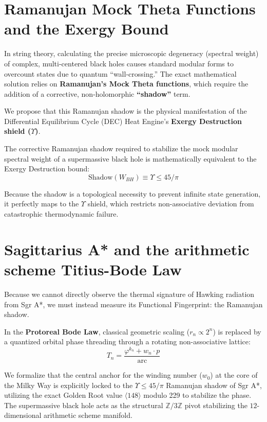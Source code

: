 \section{Ramanujan Mock Theta Functions and the Exergy Bound}
In string theory, calculating the precise microscopic degeneracy (spectral weight) of complex, multi-centered black holes causes standard modular forms to overcount states due to quantum ``wall-crossing.'' The exact mathematical solution relies on \textbf{Ramanujan's Mock Theta functions}, which require the addition of a corrective, non-holomorphic \textbf{``shadow''} term.

We propose that this Ramanujan shadow is the physical manifestation of the Differential Equilibrium Cycle (DEC) Heat Engine's \textbf{Exergy Destruction shield ($\Upsilon$)}. 

\begin{theorem}
The corrective Ramanujan shadow required to stabilize the mock modular spectral weight of a supermassive black hole is mathematically equivalent to the Exergy Destruction bound:
$$ \text{Shadow}(W_{BH}) \equiv \Upsilon \leq 45/\pi $$
\end{theorem}

Because the shadow is a topological necessity to prevent infinite state generation, it perfectly maps to the $\Upsilon$ shield, which restricts non-associative deviation from catastrophic thermodynamic failure.

\section{Sagittarius A* and the arithmetic scheme Titius-Bode Law}
Because we cannot directly observe the thermal signature of Hawking radiation from Sgr A*, we must instead measure its Functional Fingerprint: the Ramanujan shadow.

In the \textbf{Protoreal Bode Law}, classical geometric scaling ($r_n \propto 2^n$) is replaced by a quantized orbital phase threading through a rotating non-associative lattice:
$$ T_n = \frac{\varphi^{k_n} + w_n \cdot p}{\text{arc}} $$

We formalize that the central anchor for the winding number ($w_0$) at the core of the Milky Way is explicitly locked to the $\Upsilon \leq 45/\pi$ Ramanujan shadow of Sgr A*, utilizing the exact Golden Root value $\langle 148 \rangle$ modulo 229 to stabilize the phase. The supermassive black hole acts as the structural $\mathbb{Z}/3\mathbb{Z}$ pivot stabilizing the $12$-dimensional arithmetic scheme manifold.

